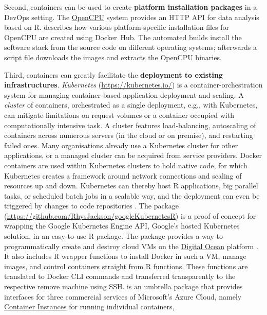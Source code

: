 Second, containers can be used to create \textbf{platform installation
packages} in a DevOps setting. The
\href{https://www.opencpu.org/}{OpenCPU} system provides an HTTP API for
data analysis based on R. \citet{ooms_opencpu_2017} describes how
various platform-specific installation files for OpenCPU are created
using Docker~Hub. The automated builds install the software stack from
the source code on different operating systems; afterwards a script file
downloads the images and extracts the OpenCPU binaries.

Third, containers can greatly facilitate the \textbf{deployment to
existing infrastructures}. \emph{Kubernetes}
(\url{https://kubernetes.io/}) is a container-orchestration system for
managing container-based application deployment and scaling. A
\emph{cluster} of containers, orchestrated as a single deployment, e.g.,
with Kubernetes, can mitigate limitations on request volumes or a
container occupied with computationally intensive task. A cluster
features load-balancing, autoscaling of containers across numerous
servers (in the cloud or on premise), and restarting failed ones. Many
organisations already use a Kubernetes cluster for other applications,
or a managed cluster can be acquired from service providers. Docker
containers are used within Kubernetes clusters to hold native code, for
which Kubernetes creates a framework around network connections and
scaling of resources up and down. Kubernetes can thereby host R
applications, big parallel tasks, or scheduled batch jobs in a scalable
way, and the deployment can even be triggered by changes to code
repositories \citep[i.e., CD, see][]{edmondson_r_2018}. The package
(\url{https://github.com/RhysJackson/googleKubernetesR}) is a proof of
concept for wrapping the Google Kubernetes Engine API, Google's hosted
Kubernetes solution, in an easy-to-use R package. The package
 provides a way to programmatically create and
destroy cloud VMs on the \href{https://www.digitalocean.com/}{Digital
Ocean} platform \citep{analogsea_2019}. It also includes R wrapper
functions to install Docker in such a VM, manage images, and control
containers straight from R functions. These functions are translated to
Docker CLI commands and transferred transparently to the respective
remove machine using SSH.  is an umbrella package
that provides interfaces for three commercial services of Microsoft's
Azure Cloud, namely
\href{https://azure.microsoft.com/en-us/services/container-instances/}{Container
Instances} for running individual containers,

